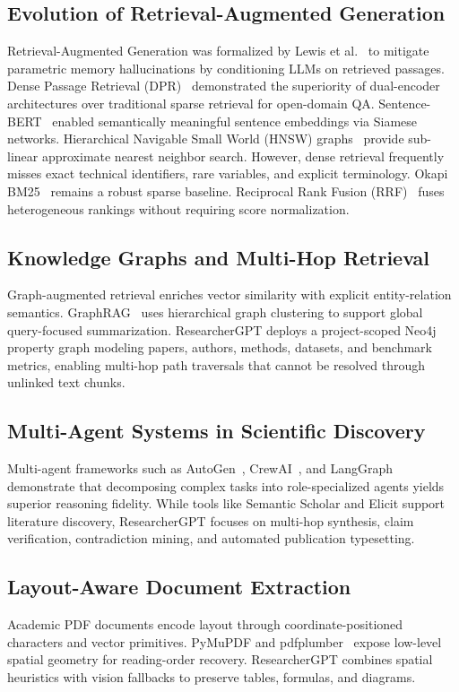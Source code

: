 \documentclass[conference]{IEEEtran}
\begin{document}
\subsection{Evolution of Retrieval-Augmented Generation}
Retrieval-Augmented Generation was formalized by Lewis et al.~\cite{lewis2020rag} to mitigate parametric memory hallucinations by conditioning LLMs on retrieved passages. Dense Passage Retrieval (DPR)~\cite{karpukhin2020dpr} demonstrated the superiority of dual-encoder architectures over traditional sparse retrieval for open-domain QA. Sentence-BERT~\cite{reimers2019sbert} enabled semantically meaningful sentence embeddings via Siamese networks. Hierarchical Navigable Small World (HNSW) graphs~\cite{malkov2020hnsw} provide sub-linear approximate nearest neighbor search. However, dense retrieval frequently misses exact technical identifiers, rare variables, and explicit terminology. Okapi BM25~\cite{robertson2009bm25} remains a robust sparse baseline. Reciprocal Rank Fusion (RRF)~\cite{cormack2009rrf} fuses heterogeneous rankings without requiring score normalization.

\subsection{Knowledge Graphs and Multi-Hop Retrieval}
Graph-augmented retrieval enriches vector similarity with explicit entity-relation semantics. GraphRAG~\cite{edge2024graphrag} uses hierarchical graph clustering to support global query-focused summarization. ResearcherGPT deploys a project-scoped Neo4j property graph modeling papers, authors, methods, datasets, and benchmark metrics, enabling multi-hop path traversals that cannot be resolved through unlinked text chunks.

\subsection{Multi-Agent Systems in Scientific Discovery}
Multi-agent frameworks such as AutoGen~\cite{wu2023autogen}, CrewAI~\cite{moura2024crewai}, and LangGraph~\cite{langgraph2024} demonstrate that decomposing complex tasks into role-specialized agents yields superior reasoning fidelity. While tools like Semantic Scholar and Elicit support literature discovery, ResearcherGPT focuses on multi-hop synthesis, claim verification, contradiction mining, and automated publication typesetting.

\subsection{Layout-Aware Document Extraction}
Academic PDF documents encode layout through coordinate-positioned characters and vector primitives. PyMuPDF and pdfplumber~\cite{singer2023pdfplumber} expose low-level spatial geometry for reading-order recovery. ResearcherGPT combines spatial heuristics with vision fallbacks to preserve tables, formulas, and diagrams.
\end{document}
